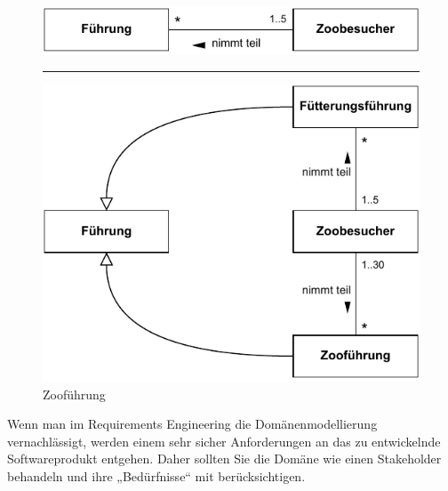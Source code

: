 \vspace{\baselineskip} %
\vspace{2mm} %

\begin{figure}[h!]
	\centering
	\includegraphics{Bilder/Kapitel-6/zoofuehrung_links.pdf}
	\vspace{\baselineskip}
	{\color{FernUni-MI-green}\rule{120mm}{1pt}} %
	\vspace{\baselineskip}
	\includegraphics{Bilder/Kapitel-6/zoofuehrung_rechts.pdf}
	\caption{Zooführung}
	\label{fig:zoofuehrung}
\end{figure}

\vspace{\baselineskip} %

Wenn man im Requirements Engineering die Domänenmodellierung vernachlässigt, werden einem sehr sicher Anforderungen an das zu entwickelnde Softwareprodukt entgehen. Daher sollten Sie die Domäne wie einen Stakeholder behandeln und ihre „Bedürfnisse“ mit berücksichtigen. 